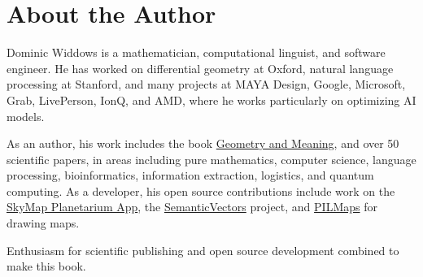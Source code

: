 \chapter{About the Author}

Dominic Widdows is a mathematician, computational linguist, and software engineer.
He has worked on differential geometry at Oxford, natural language processing at Stanford,
and many projects at MAYA Design, Google, Microsoft, Grab, LivePerson, IonQ, and AMD,
where he works particularly on optimizing AI models.

As an author, his work includes the book \href{https://www.amazon.com/-/dp/B00J4FZOOY/}{Geometry and Meaning},
and over 50 scientific papers, in areas including pure mathematics,
computer science, language processing, bioinformatics, information extraction, logistics, and quantum computing.
As a developer, his open source contributions include work on the
\href{https://github.com/sky-map-team/stardroid}{SkyMap Planetarium App},
the \href{https://github.com/semanticvectors}{SemanticVectors} project, and
\href{https://github.com/dwiddows/pilmaps}{PILMaps} for drawing maps.

Enthusiasm for scientific publishing and open source development combined to make this book. 




